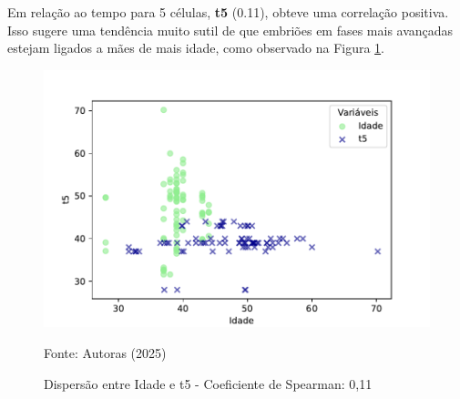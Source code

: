 Em relação ao tempo para 5 células, \textbf{t5} (0.11), obteve uma correlação positiva. Isso sugere uma tendência muito sutil de que embriões em fases mais avançadas estejam ligados a mães de mais idade, como observado na Figura \ref{fig:idade-t5}.

\begin{figure}[h]
    \captionsetup{font=footnotesize, justification=centering, labelsep=period, position=above}
    \caption{Dispersão entre Idade e t5 - Coeficiente de Spearman: 0,11}
    \label{fig:idade-t5}
    \centering
    \includegraphics[scale=0.3]{figuras/Spearman/idade-t5.pdf}
    \vspace{0.3cm} 
    \begin{minipage}{\linewidth}
        \centering
        \scriptsize{Fonte: Autoras (2025)}
    \end{minipage}
\end{figure}
\FloatBarrier

